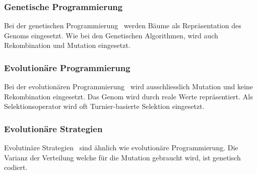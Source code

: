     \subsubsection{Genetische Programmierung\label{item:genProg}}

      Bei der genetischen Programmierung~\cite{book:genProg} werden Bäume als Repräsentation des Genoms eingesetzt. Wie bei den Genetischen Algorithmen,
      wird auch Rekombination und Mutation eingesetzt.

    \subsubsection{Evolutionäre Programmierung\label{item:evProg}}

      Bei der evolutionären Programmierung~\cite{book:artIntSimEv} wird ausschliesslich Mutation und keine Rekombination eingesetzt.
      Das Genom wird durch reale Werte repräsentiert. Als Selektionsoperator wird oft Turnier-basierte Selektion eingesetzt.

    \subsubsection{Evolutionäre Strategien\label{item:evStrat}}

      Evolutinäre Strategien~\cite{book:evStrat} sind ähnlich wie evolutionäre Programmierung.
      Die Varianz der Verteilung welche für die Mutation gebraucht wird, ist genetisch codiert.
